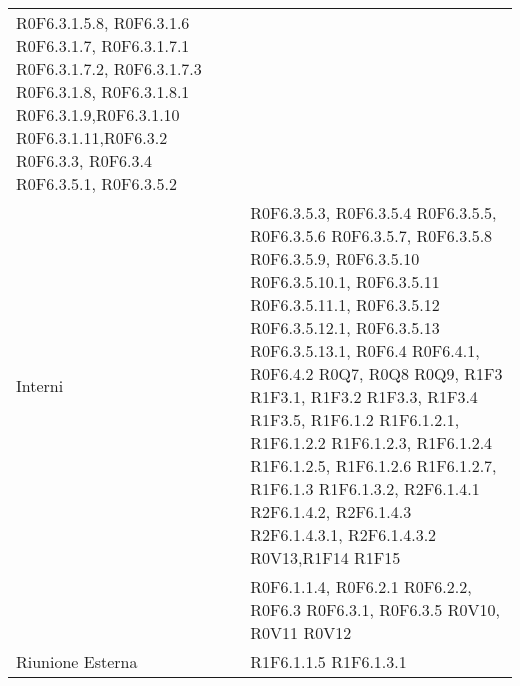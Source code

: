 \begin{longtable}{p{2.5cm}!{\VRule[1pt]}p{5.5cm}}
R0F6.3.1.5.8, R0F6.3.1.6 \newline
R0F6.3.1.7, R0F6.3.1.7.1 \newline
R0F6.3.1.7.2, R0F6.3.1.7.3 \newline
R0F6.3.1.8, R0F6.3.1.8.1 \newline
R0F6.3.1.9,R0F6.3.1.10 \newline
R0F6.3.1.11,R0F6.3.2 \newline
R0F6.3.3, R0F6.3.4 \newline
R0F6.3.5.1, R0F6.3.5.2 \\
Interni & R0F6.3.5.3, R0F6.3.5.4 \newline
R0F6.3.5.5, R0F6.3.5.6 \newline
R0F6.3.5.7, R0F6.3.5.8 \newline
R0F6.3.5.9, R0F6.3.5.10 \newline
R0F6.3.5.10.1, R0F6.3.5.11 \newline
R0F6.3.5.11.1, R0F6.3.5.12 \newline
R0F6.3.5.12.1, R0F6.3.5.13 \newline
R0F6.3.5.13.1, R0F6.4 \newline
R0F6.4.1, R0F6.4.2 \newline
R0Q7, R0Q8 \newline
R0Q9, R1F3 \newline
R1F3.1, R1F3.2 \newline
R1F3.3, R1F3.4 \newline
R1F3.5, R1F6.1.2 \newline
R1F6.1.2.1, R1F6.1.2.2 \newline
R1F6.1.2.3, R1F6.1.2.4 \newline
R1F6.1.2.5, R1F6.1.2.6 \newline
R1F6.1.2.7, R1F6.1.3 \newline
R1F6.1.3.2, R2F6.1.4.1 \newline
R2F6.1.4.2, R2F6.1.4.3 \newline
R2F6.1.4.3.1, R2F6.1.4.3.2 \newline
R0V13,R1F14 \newline
R1F15\\
 & R0F6.1.1.4, R0F6.2.1 \newline
R0F6.2.2, R0F6.3 \newline
R0F6.3.1, R0F6.3.5 \newline
R0V10, R0V11 \newline
R0V12\\
Riunione Esterna & R1F6.1.1.5 \newline
R1F6.1.3.1 \newline

\end{longtable}
